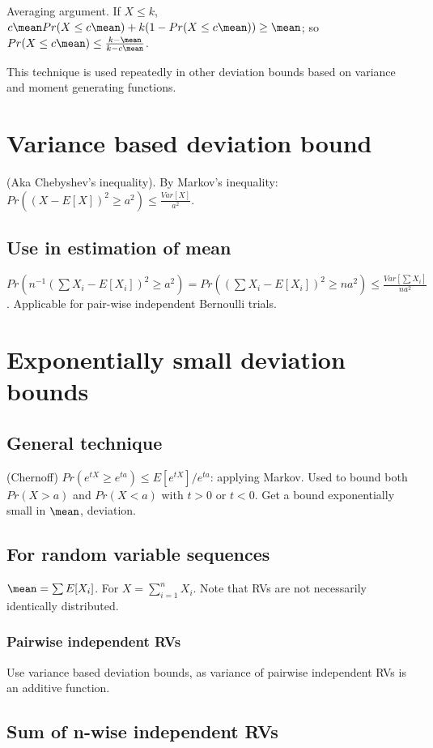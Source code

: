 \documentclass[oneside, article]{memoir}
\begin{document}
Averaging argument. If $X\leq k$, $c\mean Pr(X\leq c\mean) + k(1-Pr(X\leq c\mean)) \geq \mean$; so $Pr(X\leq c\mean) \leq \frac{k-\mean}{k-c\mean}$.

This technique is used repeatedly in other deviation bounds based on variance and moment generating functions.

\section{Variance based deviation bound}
(Aka Chebyshev's inequality). By Markov's inequality: $Pr((X-E[X])^{2} \geq a^{2})\leq  \frac{Var[X]}{a^{2}}$.

\subsection{Use in estimation of mean}
$Pr(n^{-1}(\sum X_i-E[X_i])^{2} \geq a^{2}) = Pr((\sum X_i-E[X_i])^{2} \geq na^{2})\leq  \frac{Var[\sum X_i]}{na^{2}}$. Applicable for pair-wise independent Bernoulli trials.

\section{Exponentially small deviation bounds}
\subsection{General technique}
(Chernoff) $Pr(e^{tX} \geq e^{ta})\leq E[e^{tX}]/e^{ta}$: applying Markov. Used to bound both $Pr( X>a)$ and $Pr(X<a)$ with $t>0$ or $t<0$. Get a bound exponentially small in $\mean$, deviation.

\subsection{For random variable sequences}
$\mean = \sum E[X_i]$. For $X=\sum_{i=1}^{n}X_{i}$. Note that RVs are not necessarily identically distributed.

\subsubsection{Pairwise independent RVs}
Use variance based deviation bounds, as variance of pairwise independent RVs is an additive function.

\subsection{Sum of n-wise independent RVs}
\end{document}
